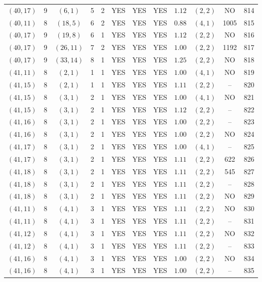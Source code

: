 \begin{longtable}{|c|c|c|c|c|c|c|c|c|c|c|c|}
$(40,17)$ & 9 & $(6,1)$ & 5 & 2 & YES & YES & YES & $1.12$ & $(2,2)$ & NO & 814\\
$(40,11)$ & 8 & $(18,5)$ & 6 & 2 & YES & YES & YES & $0.88$ & $(4,1)$ & 1005 & 815\\
$(40,17)$ & 9 & $(19,8)$ & 6 & 1 & YES & YES & YES & $1.12$ & $(2,2)$ & NO & 816\\
$(40,17)$ & 9 & $(26,11)$ & 7 & 2 & YES & YES & YES & $1.00$ & $(2,2)$ & 1192 & 817\\
$(40,17)$ & 9 & $(33,14)$ & 8 & 1 & YES & YES & YES & $1.25$ & $(2,2)$ & NO & 818\\
$(41,11)$ & 8 & $(2,1)$ & 1 & 1 & YES & YES & YES & $1.00$ & $(4,1)$ & NO & 819\\
$(41,15)$ & 8 & $(2,1)$ & 1 & 1 & YES & YES & YES & $1.11$ & $(2,2)$ & -- & 820\\
$(41,15)$ & 8 & $(3,1)$ & 2 & 1 & YES & YES & YES & $1.00$ & $(4,1)$ & NO & 821\\
$(41,15)$ & 8 & $(3,1)$ & 2 & 1 & YES & YES & YES & $1.12$ & $(2,2)$ & -- & 822\\
$(41,16)$ & 8 & $(3,1)$ & 2 & 1 & YES & YES & YES & $1.00$ & $(2,2)$ & -- & 823\\
$(41,16)$ & 8 & $(3,1)$ & 2 & 1 & YES & YES & YES & $1.00$ & $(2,2)$ & NO & 824\\
$(41,17)$ & 8 & $(3,1)$ & 2 & 1 & YES & YES & YES & $1.00$ & $(4,1)$ & -- & 825\\
$(41,17)$ & 8 & $(3,1)$ & 2 & 1 & YES & YES & YES & $1.11$ & $(2,2)$ & 622 & 826\\
$(41,18)$ & 8 & $(3,1)$ & 2 & 1 & YES & YES & YES & $1.11$ & $(2,2)$ & 545 & 827\\
$(41,18)$ & 8 & $(3,1)$ & 2 & 1 & YES & YES & YES & $1.11$ & $(2,2)$ & -- & 828\\
$(41,18)$ & 8 & $(3,1)$ & 2 & 1 & YES & YES & YES & $1.11$ & $(2,2)$ & NO & 829\\
$(41,11)$ & 8 & $(4,1)$ & 3 & 1 & YES & YES & YES & $1.11$ & $(2,2)$ & NO & 830\\
$(41,11)$ & 8 & $(4,1)$ & 3 & 1 & YES & YES & YES & $1.11$ & $(2,2)$ & -- & 831\\
$(41,12)$ & 8 & $(4,1)$ & 3 & 1 & YES & YES & YES & $1.11$ & $(2,2)$ & NO & 832\\
$(41,12)$ & 8 & $(4,1)$ & 3 & 1 & YES & YES & YES & $1.11$ & $(2,2)$ & -- & 833\\
$(41,16)$ & 8 & $(4,1)$ & 3 & 1 & YES & YES & YES & $1.00$ & $(2,2)$ & NO & 834\\
$(41,16)$ & 8 & $(4,1)$ & 3 & 1 & YES & YES & YES & $1.00$ & $(2,2)$ & -- & 835\\

\end{longtable}

